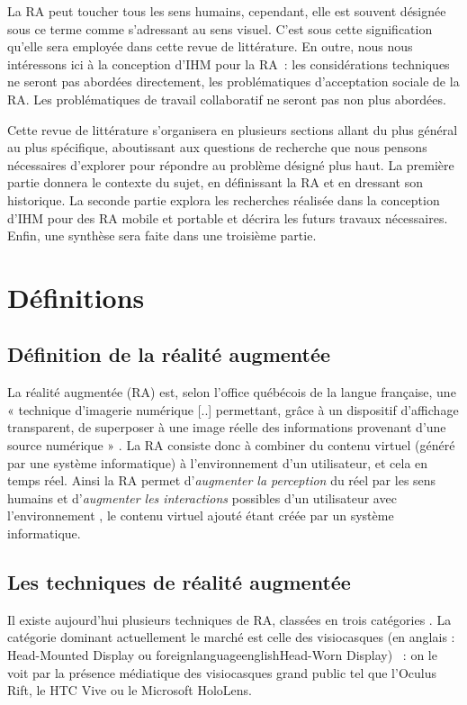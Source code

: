 La RA peut toucher tous les sens humains, cependant, elle est souvent désignée sous ce terme comme s'adressant au sens visuel. C'est sous cette signification qu'elle sera employée dans cette revue de littérature. En outre, nous nous intéressons ici à la conception d'IHM pour la RA~: les considérations techniques ne seront pas abordées directement, les problématiques d'acceptation sociale de la RA. Les problématiques de travail collaboratif ne seront pas non plus abordées.

Cette revue de littérature s'organisera en plusieurs sections allant du plus général au plus spécifique, aboutissant aux questions de recherche que nous pensons nécessaires d'explorer pour répondre au problème désigné plus haut. La première partie donnera le contexte du sujet, en définissant la RA et en dressant son historique. La seconde partie explora les recherches réalisée dans la conception d'IHM pour des RA mobile et portable et décrira les futurs travaux nécessaires. Enfin, une synthèse sera faite dans une troisième partie.


\section*{Définitions}
\subsection*{Définition de la réalité augmentée}
La réalité augmentée (RA) est, selon l'office québécois de la langue française, une « technique d'imagerie numérique [..] permettant, grâce à un dispositif d'affichage transparent, de superposer à une image réelle des informations provenant d'une source numérique » \citep{OfficeQuebecoisLangueFrancaiseRA2015}. La RA consiste donc à combiner du contenu virtuel (généré par une système informatique) à l'environnement d'un utilisateur, et cela en temps réel. Ainsi la RA permet d'\emph{augmenter la perception} du réel par les sens humains et d'\emph{augmenter les interactions} possibles d'un utilisateur avec l'environnement \citep{Azuma1997}, le contenu virtuel ajouté étant créée par un système informatique.

\subsection*{Les techniques de réalité augmentée}
Il existe aujourd'hui plusieurs techniques de RA, classées en trois catégories . La catégorie dominant actuellement le marché est celle des visiocasques (en anglais : \foreignlanguage{english}{Head-Mounted Display} ou foreignlanguage{english}{Head-Worn Display}) \citep{VanKrevelenPoelman2010}~: on le voit par la présence médiatique des visiocasques grand public tel que l'Oculus Rift, le HTC Vive ou le Microsoft HoloLens.

